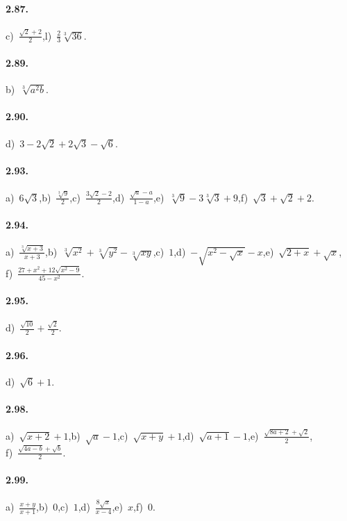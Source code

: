 \paragraph{2.87.}
c)~$\frac{\sqrt 2+2} 2$,\quad l)~$\frac 2 3\sqrt[3]{36}$.

\paragraph{2.89.}
b)~$\sqrt[3]{a^2b}$.

\paragraph{2.90.}
d)~$3-2\sqrt 2+2\sqrt 3-\sqrt 6$.

\paragraph{2.93.}
a)~$6\sqrt{3}$,\quad b)~$\frac{\sqrt[3]{9}}{2}$,\quad c)~$\frac{3\sqrt{2}-2}{2}$,\quad d)~$\frac{\sqrt{a}-a}{1-a}$,\quad e)~$\sqrt[3]{9}-3\sqrt[3]{3}+9$,\quad f)~$\sqrt{3}+\sqrt{2}+2$.

\paragraph{2.94.}
a)~$\frac{\sqrt[3]{x+3}}{x+3}$,\quad b)~$\sqrt[3]{x^2}+\sqrt[3]{y^2}-\sqrt[3]{xy}$,\quad c)~$1$,\quad d)~$-\sqrt{x^2-\sqrt{x}}-x$,\quad e)~$\sqrt{2+x}+\sqrt{x}$,\protect\\
\quad f)~$\frac{27+x^2+12\sqrt{x^2-9}}{45-x^2}$.

\paragraph{2.95.}
d)~$\frac{\sqrt{10}} 2+\frac{\sqrt 2} 2$.

\paragraph{2.96.}
d)~$\sqrt 6+1$.

\paragraph{2.98.}
a)~$\sqrt{x+2}+1$,\quad b)~$\sqrt{a}-1$,\quad c)~$\sqrt{x+y}+1$,\quad d)~$\sqrt{a+1}-1$,\quad e)~$\frac{\sqrt{8a+2}+\sqrt{2}}{2}$,\protect\\\quad f)~$\frac{\sqrt{4a-b}+\sqrt{b}}{2}$.

\paragraph{2.99.}
a)~$\frac{x+y}{x+1}$,\quad b)~$0$,\quad c)~$1$,\quad d)~$\frac{8\sqrt{x}}{x-4}$,\quad e)~$x$,\quad f)~$0$.

